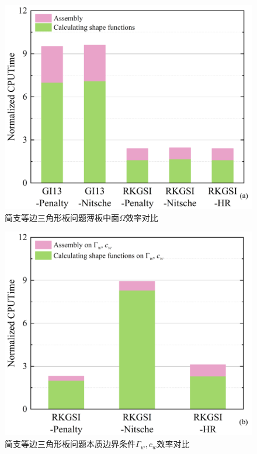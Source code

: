 \begin{figure}[H]
    \centering
    \includegraphics[scale=0.5]{figure/PHR/T/Cefficiencyomega.png}
    \caption{简支等边三角形板问题薄板中面$\Omega$效率对比}\label{Tefficiency1}
\end{figure}
\begin{figure}[H]
    \centering
    \includegraphics[scale=0.5]{figure/PHR/T/Cefficiencygamma.png}
    \caption{简支等边三角形板问题本质边界条件$\Gamma_w,c_w$效率对比}\label{Tefficiency2}
\end{figure}
\newpage
